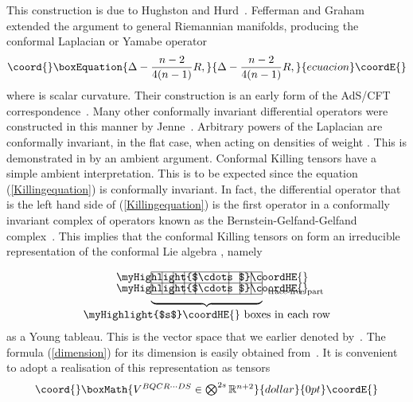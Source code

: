 \documentclass[a4paper,12pt]{amsart}
\begin{document}
This construction is due to Hughston and Hurd~\cite{hh}. Fefferman and
Graham~\cite{fg} extended the argument to general Riemannian manifolds,
producing the conformal Laplacian or Yamabe operator
\begin{equation}\coord{}\boxEquation{\label{yamabe}\Delta-\frac{n-2}{4(n-1)}R,}{\Delta-\frac{n-2}{4(n-1)}R,}{ecuacion}\coordE{}\end{equation}
where \coordHE{} is scalar curvature. Their construction is an early form of the
AdS/CFT correspondence~\cite{ma,wi}. Many other conformally invariant
differential operators were constructed in this manner by Jenne~\cite{j}.
Arbitrary powers of the Laplacian \coordHE{} are conformally invariant, in the
flat case, when acting on densities of weight \coordHE{}. This is demonstrated in
\cite[Proposition~4.4]{eg} by an ambient argument.
Conformal Killing tensors have a simple ambient interpretation. This is to be
expected since the equation (\ref{Killingequation}) is conformally invariant.
In fact, the differential operator that is the left hand side of
(\ref{Killingequation}) is the first operator in a conformally invariant
complex of operators known as the Bernstein-Gelfand-Gelfand
complex~\cite{beastwood,bgg,cd,css,l}. This implies that the conformal Killing
tensors on \coordHE{} form an irreducible representation of the conformal
Lie algebra \coordHE{}, namely
$$\underbrace{\begin{picture}(100,30)
\put(0,5){\line(1,0){100}}
\put(0,15){\line(1,0){100}}
\put(0,25){\line(1,0){100}}
\put(0,5){\line(0,1){20}}
\put(10,5){\line(0,1){20}}
\put(20,5){\line(0,1){20}}
\put(30,5){\line(0,1){20}}
\put(40,5){\line(0,1){20}}
\put(70,5){\line(0,1){20}}
\put(80,5){\line(0,1){20}}
\put(90,5){\line(0,1){20}}
\put(100,5){\line(0,1){20}}
\put(55,10){\makebox(0,0){\myHighlight{$\cdots$}\coordHE{}}}
\put(55,20){\makebox(0,0){\myHighlight{$\cdots$}\coordHE{}}}
\put(105,7){\makebox(0,0)[l]{\scriptsize trace-free part}}
\end{picture}}_{\mbox{\myHighlight{$s$}\coordHE{} boxes in each row}}$$
as a Young tableau. This is the vector space that we earlier denoted
by~\coordHE{}. The formula (\ref{dimension}) for its dimension is
easily obtained from~\cite{ki}. It is convenient to adopt a realisation
of this representation as tensors
$$\coord{}\boxMath{\textstyle V^{BQCR\cdots DS}\in\bigotimes^{2s}{\mathbb R}^{n+2}}{dollar}{0pt}\coordE{}$$
\end{document}
